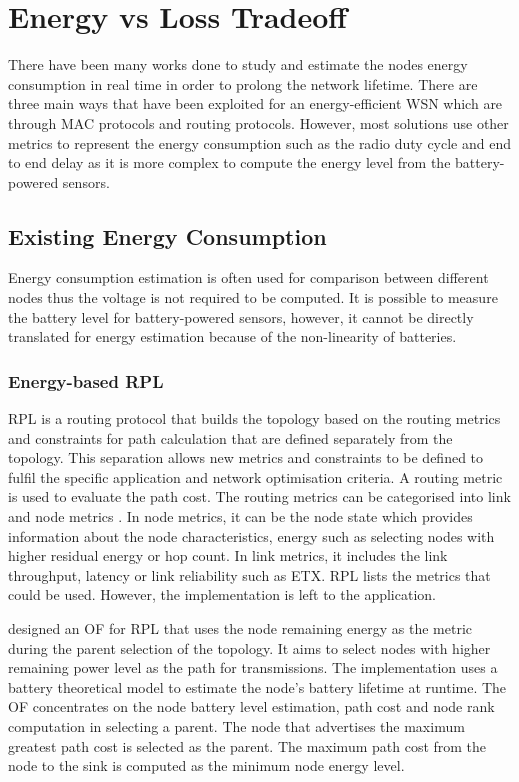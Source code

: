 \chapter{Energy vs Loss Tradeoff}
\label{energyLoss}
There have been many works done to study and estimate the nodes energy consumption in real time in order to prolong the network lifetime. There are three main ways that have been exploited for an energy-efficient WSN which are through MAC protocols and routing protocols. However, most solutions use other metrics to represent the energy consumption such as the radio duty cycle and end to end delay as it is more complex to compute the energy level from the battery-powered sensors. 

\section{Existing Energy Consumption}
Energy consumption estimation is often used for comparison between different nodes thus the voltage is not required to be computed. It is possible to measure the battery level for battery-powered sensors, however, it cannot be directly translated for energy estimation because of the non-linearity of batteries.

\subsection{Energy-based RPL}
RPL is a routing protocol that builds the topology based on the routing metrics and constraints for path calculation that are defined separately from the topology. This separation allows new metrics and constraints to be defined to fulfil the specific application and network optimisation criteria. A routing metric is used to evaluate the path cost. The routing metrics can be categorised into link and node metrics \cite{routingmetrics}. In node metrics, it can be the node state which provides information about the node characteristics, energy such as selecting nodes with higher residual energy or hop count. In link metrics, it includes the link throughput, latency or link reliability such as ETX. RPL lists the metrics that could be used. However, the implementation is left to the application. 

\cite{energyrpl} designed an OF for RPL that uses the node remaining energy as the metric during the parent selection of the topology. It aims to select nodes with higher remaining power level as the path for transmissions. The implementation uses a battery theoretical model \cite{sensornets13} to estimate the node's battery lifetime at runtime. The OF concentrates on the node battery level estimation, path cost and node rank computation in selecting a parent. The node that advertises the maximum greatest path cost is selected as the parent. The maximum path cost from the node to the sink is computed as the minimum node energy level. 

